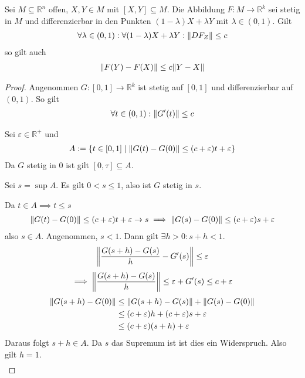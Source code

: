 \documentclass{report}
\renewcommand\epsilon{\varepsilon}
\newcommand*{\newpar}{\par\vspace{\baselineskip}\noindent}
\newcommand{\bR}{\mathbb{R}}
\begin{document}
\begin{theorem}
 Sei $M \subseteq \bR^n$ offen, $X,Y \in M$ mit $[X,Y] \subseteq M$. Die Abbildung $F : M \to \bR^k$ sei stetig in $M$ und differenzierbar in den Punkten $(1-\lambda)X + \lambda Y$ mit $\lambda \in (0,1)$. Gilt
 \begin{align*}
  \forall \lambda \in (0,1) : \forall (1-\lambda)X + \lambda Y : \norm{DF_Z} \leq c 
 \end{align*}
 so gilt auch
 \begin{align*}
  \norm{F(Y) - F(X)} \leq c\norm{Y - X}
 \end{align*}
 \begin{proof}
  Angenommen $G : [0,1] \to \bR^k$ ist stetig auf $[0,1]$ und differenzierbar auf $(0,1)$. So gilt 
  \begin{align*}
  \forall t \in (0,1) : \norm{G'(t)} \leq c
  \end{align*}
 \newpar
 Sei $\epsilon \in \bR^+$ und 
 \begin{align*}
  A := \{t \in [0,1] \mid \norm{G(t) - G(0)} \leq (c + \epsilon) t + \epsilon\}
 \end{align*}
 Da $G$ stetig in $0$ ist gilt $[0, \tau] \subseteq A$.
 \newpar
 Sei $s = \sup A$. Es gilt $0 < s \leq 1$, also ist $G$ stetig in $s$.
 \newpar
 Da $t \in A \implies t \leq s$ 
 \begin{align*}
  \norm{G(t) - G(0)} \leq (c + \epsilon) t + \epsilon \to s
  \implies \norm{G(s) - G(0)} \leq (c + \epsilon) s + \epsilon
 \end{align*}
 also $s \in A$. Angenommen, $s < 1$. Dann gilt $\exists h > 0 : s + h < 1$.
 \begin{align*}
  \norm{\frac{G(s + h) - G(s)}{h} - G'(s)} \leq \epsilon
 \end{align*}
 \begin{align*}
  \implies \norm{\frac{G(s + h) - G(s)}{h}} \leq \epsilon +  G'(s) \leq c + \epsilon
 \end{align*}
 \begin{align*}
  \norm{G(s + h) - G(0)} &\leq \norm{G(s + h) - G(s)} + \norm{G(s) - G(0)}\\
                         &\leq (c + \epsilon) h + (c + \epsilon) s + \epsilon\\
                         &\leq (c + \epsilon)(s + h) + \epsilon\\
 \end{align*}
 Daraus folgt $s + h \in A$. Da $s$ das Supremum ist ist dies ein Widerspruch. Also gilt $h = 1$.
 \begin{align*}

\end{align*}
\end{proof}
\end{theorem}
\end{document}
